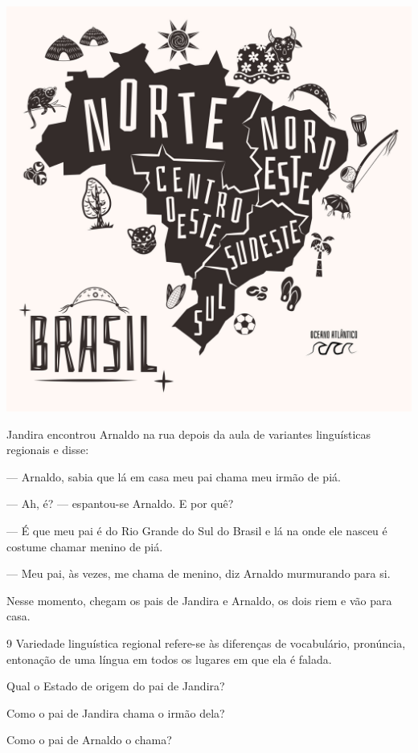 \begin{myquote}
\begin{center}
\includegraphics[width=.7\textwidth]{./media/image19c.jpeg}
\end{center}

Jandira encontrou Arnaldo na rua depois da aula de variantes linguísticas regionais 
e disse:

--- Arnaldo, sabia que lá em casa meu pai chama meu irmão de piá.

--- Ah, é? --- espantou-se Arnaldo. E por quê?

--- É que meu pai é do Rio Grande do Sul do Brasil 
e lá na onde ele nasceu é costume chamar menino de piá.

--- Meu pai, às vezes, me chama de menino, 
diz Arnaldo murmurando para si.

Nesse momento, chegam os pais de Jandira e Arnaldo, os dois riem e vão para casa.   

\end{myquote}

\num{9} Variedade linguística regional refere-se às diferenças 
de vocabulário, pronúncia, entonação de uma língua em todos 
os lugares em que ela é falada. 

\begin{escolha}
\item Qual o Estado de origem do pai de Jandira?

\item Como o pai de Jandira chama o irmão dela?

\item Como o pai de Arnaldo o chama?
\end{escolha}

